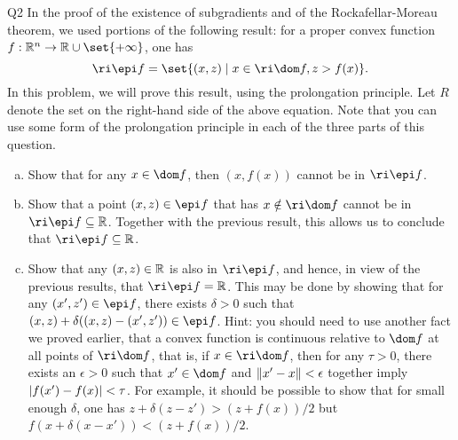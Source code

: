 \documentclass{article}
\begin{document}
\begin{problem}
    {Q2}
    In the proof of the existence of subgradients and of the Rockafellar-Moreau theorem, we used portions of the following result: for a proper convex function $f:\R^n\rightarrow \R\cup\set{+\infty}$, one has \[\ri\epi f=\set{(x,z)\mid x\in\ri\dom f, z>f(x)}.\] In this problem, we will prove this result, using the prolongation principle. Let $R$ denote the set on the right-hand side of the above equation. Note that you can use some form of the prolongation principle in each of the three parts of this question.
    \begin{enumerate}[(a)]
        \item Show that for any $x\in\dom f$, then $(x,f(x))$ cannot be in $\ri\epi f$.
        \item Show that a point $(x,z)\in\epi f$ that has $x\notin \ri\dom f$ cannot be in $\ri\epi f\subseteq \R$. Together with the previous result, this allows us to conclude that $\ri\epi f\subseteq \R$.
        \item Show that any $(x,z)\in \mathbb{R}$ is also in $\ri\epi f$, and hence, in view of the previous results, that $\ri\epi f= \R$. This may be done by showing that for any $(x',z')\in\epi f$, there exists $\delta>0$ such that $(x,z)+\delta((x,z)-(x',z'))\in\epi f$. Hint: you should need to use another fact we proved earlier, that a convex function is continuous relative to $\dom f$ at all points of $\ri\dom f$, that is, if $x\in \ri\dom f$, then for any $\tau>0$, there exists an $\epsilon>0$ such that $x'\in\dom f$ and $\lVert x'-x\rVert<\epsilon$ together imply $\lvert f(x')-f(x)\rvert<\tau$. For example, it should be possible to show that for small enough $\delta$, one has $z+\delta(z-z')>(z+f(x))/2$ but $f(x+\delta(x-x'))<(z+f(x))/2$.
    \end{enumerate}
\end{problem}
\end{document}

